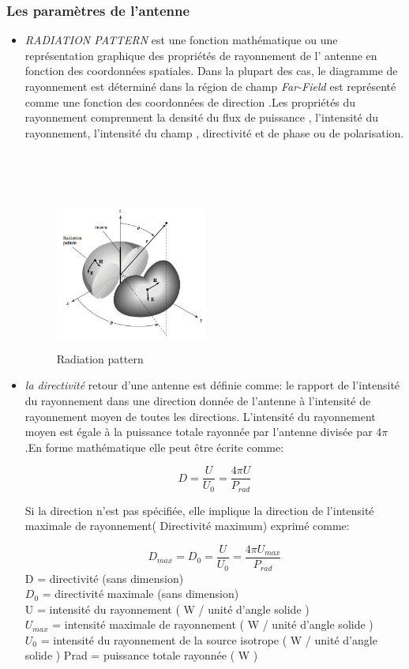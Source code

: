 \documentclass[11pt, a4paper, twoside]{book}
\begin{document}
\subsubsection{Les paramètres de l'antenne}
\begin{itemize}
\item \emph{RADIATION PATTERN} est une fonction mathématique ou une représentation graphique des propriétés de rayonnement de l' antenne en fonction des coordonnées spatiales. Dans la plupart des cas, le diagramme de rayonnement est déterminé dans la région de champ \emph{Far-Field} est représenté comme une fonction des coordonnées de direction .Les propriétés du rayonnement comprennent la densité du flux de puissance , l'intensité du rayonnement, l'intensité du champ , directivité et de phase ou de polarisation.\\\\\\\\
\begin{figure}[H]
\centering
\includegraphics[width=5cm,height=5cm]{radpa}
\caption{Radiation pattern}
\end{figure}
\item \emph{la directivité} retour d'une antenne est définie comme: le rapport de l'intensité du rayonnement dans une direction donnée de l'antenne à l'intensité de rayonnement moyen de toutes les directions. L'intensité du rayonnement moyen est égale à la puissance totale rayonnée par l'antenne divisée par 4\(\pi\) .En forme mathématique elle peut être écrite comme:

\begin{equation}
D = \dfrac{U}{U_{0}} = \dfrac{4 \pi U}{P_{rad}}
\end{equation}

Si la direction n'est pas spécifiée, elle implique la direction de l'intensité maximale de rayonnement( Directivité maximum) exprimé comme:

\begin{equation}
D_{max} = D_{0} = \dfrac{U}{U_{0}} = \dfrac{4 \pi U_{max}}{P_{rad}}
\end{equation}
D = directivité (sans dimension)\\
\(D_{0}\) = directivité maximale (sans dimension)\\
U = intensité du rayonnement ( W / unité d'angle solide )\\
\(U_{max}\) = intensité maximale de rayonnement ( W / unité d'angle solide )\\
\(U_{0}\) = intensité du rayonnement de la source isotrope ( W / unité d'angle solide ) Prad = puissance totale rayonnée ( W )\\


\end{itemize}
\end{document}
